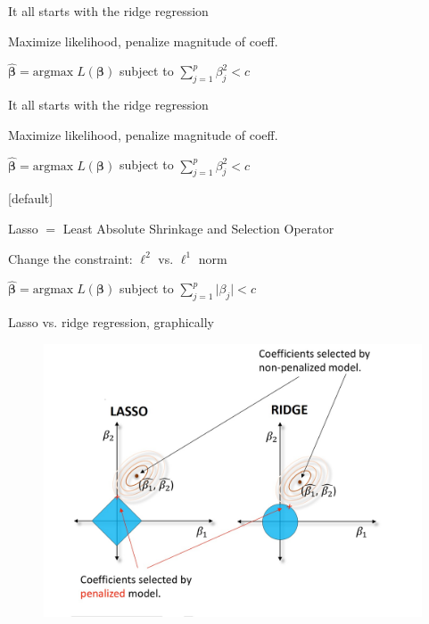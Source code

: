 \documentclass[14pt]{beamer}
\begin{document}
\begin{frame}[fragile]{It all starts with the ridge regression}

{\color{blue}Maximize likelihood}, penalize magnitude of coeff.

{\color{blue}$\widehat{\boldsymbol{\beta}} = \text{argmax} \; L(\boldsymbol{\beta})$} subject to $\displaystyle{\sum_{j=1}^{p}{ \beta_j^2}} < c$

\end{frame}

\begin{frame}[fragile]{It all starts with the ridge regression}

Maximize likelihood, {\color{blue}penalize magnitude of coeff.}

$\widehat{\boldsymbol{\beta}} = \text{argmax} \; L(\boldsymbol{\beta})$ subject to {\color{blue}$\displaystyle{\sum_{j=1}^{p}{ \beta_j^2}} < c$}

\end{frame}

[default]

\begin{frame}[fragile]{Lasso $=$ \small{Least Absolute \alert{Shrinkage} and \alert{Selection} Operator}}

Change the constraint: $\ell^2$ vs. $\ell^1$ norm

$\widehat{\boldsymbol{\beta}} = \text{argmax} \; L(\boldsymbol{\beta})$ subject to $\displaystyle{\sum_{j=1}^{p}{\lvert \beta_j \rvert}} < c$

\end{frame}

\begin{frame}[fragile]{Lasso vs. ridge regression, graphically}

{
  \begin{figure}
    \centering
    \includegraphics[width = 1\textwidth]{lasso2.jpeg}
  \end{figure}
}

\end{frame}
\end{document}
